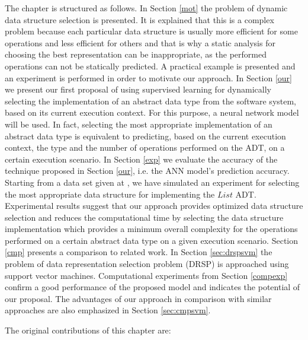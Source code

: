 The chapter is structured as follows. In Section \ref{mot} the problem of dynamic data structure selection is presented. It is explained that this is a complex problem because each particular data structure is usually more efficient for some operations and less efficient for others and that is why a static analysis for choosing the best representation can be inappropriate, as the performed operations can not be statically predicted. A practical example is presented and an experiment is performed in order to motivate our approach. 
In Section \ref{our} we present our first proposal of using supervised learning for dynamically selecting the implementation of an abstract data type from the software system, based on its current execution context. For this purpose, a neural network model will be used. In fact, selecting the most appropriate implementation of an abstract data type is equivalent to predicting, based on the current execution context, the type and the number of operations performed on the ADT, on a certain execution scenario.
In Section \ref{exp} we evaluate the accuracy of the technique proposed in Section \ref{our}, i.e. the ANN model's prediction accuracy. Starting from a data set given at \cite{forina}, we have simulated an experiment for selecting the most appropriate data structure for implementing the $List$ ADT. Experimental results suggest that our approach provides optimized data structure selection and reduces the computational time by selecting the data structure implementation which provides a minimum overall complexity for the operations performed on a certain abstract data type on a given execution scenario. Section \ref{cmp} presents a comparison to related work.
In Section \ref{sec:drspsvm} the problem of data representation selection problem (DRSP) is approached using support vector machines. Computational experiments from Section \ref{compexp} confirm a good performance of the proposed model and indicates the potential of our proposal. The advantages of our approach in comparison with similar approaches are also emphasized in Section \ref{sec:cmpsvm}.  



The original contributions of this chapter are:

